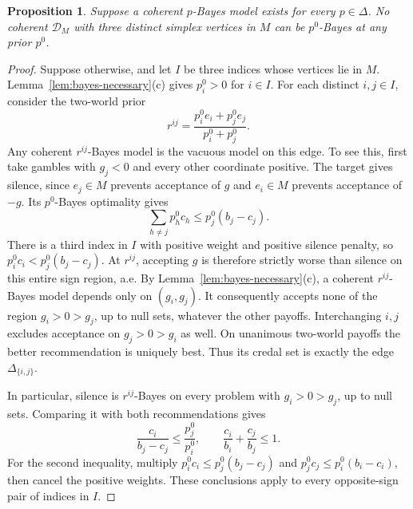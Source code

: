 \documentclass[11pt]{article}
\newtheorem{proposition}[theorem]{Proposition}
\theoremstyle{remark}
\newcommand{\Dscr}{\mathcal D}
\begin{document}
\begin{proposition}\label{prop:bayes-vertex-obstruction}
Suppose a coherent $p$-Bayes model exists for every $p\in\Delta$.
No coherent $\Dscr_M$ with three distinct simplex vertices in $M$ can be
$p^0$-Bayes at any prior $p^0$.
\end{proposition}
\begin{proof}
Suppose otherwise, and let $I$ be three indices whose vertices lie in $M$.
Lemma~\ref{lem:bayes-necessary}(c) gives $p_i^0>0$ for $i\in I$.
For each distinct $i,j\in I$, consider the two-world prior
\[
 r^{ij}=\frac{p_i^0e_i+p_j^0e_j}{p_i^0+p_j^0}.
\]
Any coherent $r^{ij}$-Bayes model is the vacuous model on this edge.
To see this, first take gambles with $g_j<0$ and every other coordinate
positive. The target gives silence, since $e_j\in M$ prevents acceptance
of $g$ and $e_i\in M$ prevents acceptance of $-g$.
Its $p^0$-Bayes optimality gives
\[
 \sum_{h\ne j}p_h^0c_h\le p_j^0(b_j-c_j).
\]
There is a third index in $I$ with positive weight and positive silence
penalty, so
$p_i^0c_i<p_j^0(b_j-c_j)$.
At $r^{ij}$, accepting $g$ is therefore strictly worse than silence on
this entire sign region, a.e.
By Lemma~\ref{lem:bayes-necessary}(c), a coherent $r^{ij}$-Bayes model
depends only on $(g_i,g_j)$. It consequently accepts none of the region
$g_i>0>g_j$, up to null sets, whatever the other payoffs.
Interchanging $i,j$ excludes acceptance on $g_j>0>g_i$ as well.
On unanimous two-world payoffs the better recommendation is uniquely best.
Thus its credal set is exactly the edge $\Delta_{\{i,j\}}$.

In particular, silence is $r^{ij}$-Bayes on every problem with
$g_i>0>g_j$, up to null sets. Comparing it with both recommendations gives
\begin{equation}
 \frac{c_i}{b_j-c_j}\le\frac{p_j^0}{p_i^0},
 \qquad
 \frac{c_i}{b_i}+\frac{c_j}{b_j}\le1.
 \label{eq:forced-edge-bounds}
\end{equation}
For the second inequality, multiply
$p_i^0c_i\le p_j^0(b_j-c_j)$ and
$p_j^0c_j\le p_i^0(b_i-c_i)$, then cancel the positive weights.
These conclusions apply to every opposite-sign pair of indices in $I$.


\end{proof}
\end{document}
